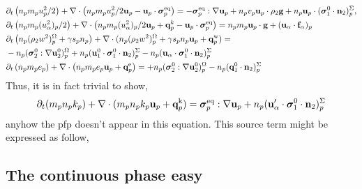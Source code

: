 \begin{align*}
    &\partial_t \left(n_p m_p u_p^2/ 2\right)
    + \mathbf{\nabla}\cdot \left(n_p
    m_p u_p^2/ 2 \textbf{u}_p 
    - \textbf{u}_p \cdot \bm{\sigma}_p^\text{eq}
    \right)
    = 
    - \bm{\sigma}_p^\text{eq}  :\mathbf{\nabla} \textbf{u}_p
    +  n_p v_p \textbf{u}_p \cdot 
    \rho_2 \textbf{g}
    + n_p \textbf{u}_p \cdot (\bm{\sigma}_1^0 \cdot \textbf{n}_2)^\Sigma_p,\\
    &\partial_t \left(n_p m_p (u_\alpha^2)_p/ 2\right)
    + \mathbf{\nabla}\cdot \left(n_p
    m_p (u_\alpha^2)_p/ 2 \textbf{u}_p 
    + \textbf{q}^k_p
    - \textbf{u}_p \cdot \bm{\sigma}_p^\text{eq}
    \right)
    = 
    n_p m_p \textbf{u}_p \cdot
    \textbf{g}
    + 
    (\textbf{u}_\alpha\cdot
    \textbf{f}_\alpha)_p\\
    &\partial_t \left(n_p (\rho_2 w^2 )_p^\Omega+\gamma s_p n_p\right)
    + \mathbf{\nabla}\cdot 
    (n_p (\rho_2 w^2 )_p^\Omega+\gamma s_p n_p
    \textbf{u}_p 
    +  \textbf{q}_p^\text{w}
    )
    = \\
    &- n_p (\bm{\sigma}_2^0 : \mathbf{\nabla}\textbf{u}_2^0)^\Omega_p
    + n_p (\textbf{u}_1^0 \cdot \bm{\sigma}_1^0 \cdot  \textbf{n}_2)^\Sigma_p
    - n_p (\textbf{u}_\alpha \cdot \bm{\sigma}_1^0 \cdot  \textbf{n}_2)^\Sigma_p
    \\
    &\partial_t \left(n_p m_p e_p\right)
    + \mathbf{\nabla}\cdot \left(n_p
    m_p e_p \textbf{u}_p 
    +  \textbf{q}_p^\text{e}
    \right)
    = 
    + n_p (\bm{\sigma}_2^0 : \mathbf{\nabla}\textbf{u}_2^0)^\Omega_p
    - n_p (\textbf{q}_1^0\cdot \textbf{n}_2)^\Sigma_p\\
\end{align*}
Thus, it is in fact trivial to show, 
\begin{multline*}
    \partial_t(m_p n_pk_p)
    + \mathbf{\nabla}\cdot(m_pn_p k_p \textbf{u}_p 
    + \textbf{q}_p^\text{k})
    = 
     \bm{\sigma}_p^\text{eq}  :\mathbf{\nabla} \textbf{u}_p
     + n_p (\textbf{u}_\alpha' \cdot \bm{\sigma}_1^0 \cdot  \textbf{n}_2)^\Sigma_p
    \\
\end{multline*}
anyhow the pfp doesn't appear in this equation. 
This source term might be expressed as follow, 


\subsection{The continuous phase easy}

